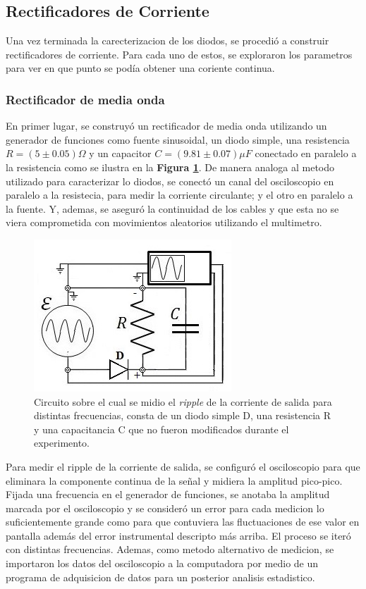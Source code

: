 \documentclass[11pt,a4paper]{article}
\begin{document}
\subsection{Rectificadores de Corriente}
Una vez terminada la carecterizacion de los diodos, se procedió a construir rectificadores de corriente. Para cada uno de estos, se exploraron los parametros para ver en que punto se podía obtener una coriente continua.

\subsubsection{Rectificador de media onda}
En primer lugar, se construyó un rectificador de media onda utilizando un generador de funciones como fuente sinusoidal, un diodo simple, una resistencia $R = (5 \pm 0.05)\Omega$ y un capacitor $C = (9.81 \pm 0.07)\mu F$ conectado en paralelo a la resistencia como se ilustra en la \textbf{Figura \ref{fig:Re-M-O}}. De manera analoga al metodo utilizado para caracterizar lo diodos, se conectó un canal del osciloscopio en paralelo a la resistecia, para medir la corriente circulante; y el otro en paralelo a la fuente. Y, ademas, se aseguró la continuidad de los cables y que esta no se viera comprometida con movimientos aleatorios utilizando el multimetro.

\begin{figure}[H]
\centering
\includegraphics[scale=0.8]{Rectificador-Media-Onda}
   \caption{Circuito sobre el cual se midio el \textit{ripple} de la corriente de salida para distintas frecuencias, consta de un diodo simple D, una resistencia R y una capacitancia C que no fueron modificados durante el experimento. }
   \label{fig:Re-M-O}
\end{figure}

Para medir el ripple de la corriente de salida, se configuró el osciloscopio para que eliminara la componente continua de la señal y midiera la amplitud pico-pico. Fijada una frecuencia en el generador de funciones, se anotaba la amplitud marcada por el osciloscopio y se consideró un error para cada medicion lo suficientemente grande como para que contuviera las fluctuaciones de ese valor en pantalla además del error instrumental descripto más arriba. El proceso se iteró con distintas frecuencias.  Ademas, como metodo alternativo de medicion, se importaron los datos del osciloscopio a la computadora por medio de un programa de adquisicion de datos para un posterior analisis estadistico.
\end{document}
